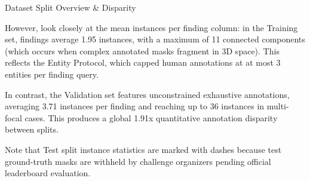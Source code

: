 \documentclass[aspectratio=169, 10pt]{beamer}
\begin{document}
\begin{frame}{Dataset Split Overview \& Disparity}
{        However, look closely at the mean instances per finding column: in the Training set, findings average 1.95 instances, with a maximum of 11 connected components (which occurs when complex annotated masks fragment in 3D space). This reflects the Entity Protocol, which capped human annotations at at most 3 entities per finding query.

        In contrast, the Validation set features unconstrained exhaustive annotations, averaging 3.71 instances per finding and reaching up to 36 instances in multi-focal cases. This produces a global 1.91x quantitative annotation disparity between splits.

        Note that Test split instance statistics are marked with dashes because test ground-truth masks are withheld by challenge organizers pending official leaderboard evaluation.
    }
\end{frame}
\end{document}
